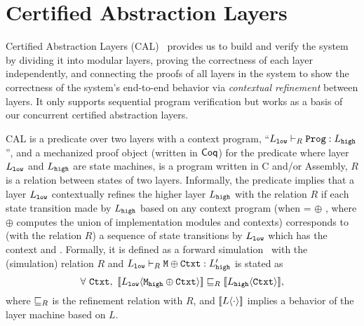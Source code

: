 \section{Certified Abstraction Layers}
\label{chapter:ccal:sec:cal}

Certified Abstraction Layers (CAL)~\cite{deepspec} provides us to build and verify the system by dividing it into modular layers, 
proving the correctness of each layer independently, and connecting the proofs of all layers in the system to show the correctness of the system's end-to-end behavior via \textit{contextual refinement} between layers. 
It only supports sequential program verification but works as a basis of our concurrent certified abstraction layers.

CAL is a predicate over two layers with a context program, 
``$L_{{\mathrm{\texttt{low}}}} \vdash_{R} {\mathrm{\texttt{Prog}}} : L_{{\mathrm{\texttt{high}}}}$'', 
and a mechanized proof object (written in $\mathsf{Coq}$) for the predicate where layer $L_{{\mathrm{\texttt{low}}}}$ and $L_{{\mathrm{\texttt{high}}}}$ are state machines,  is a program written in C and/or Assembly, $R$ is a relation between states of two layers.
Informally, the predicate implies that 
a layer $L_{{\mathrm{\texttt{low}}}}$ contextually refines the higher layer $L_{{\mathrm{\texttt{high}}}}$ with the relation $R$
 if each state transition made by $L_{{\mathrm{\texttt{high}}}}$ based on any context program  (when  =  $\oplus$ , where $\oplus$ computes the union of implementation modules and contexts) corresponds to (with the relation $R$)  a sequence of 
 state transitions by $L_{{\mathrm{\texttt{low}}}}$ which has the context  and  .
 Formally, it is defined as a forward simulation~\cite{Lynch95,leroy09,Milner71,Park81} with the (simulation) relation $R$
 and  $L_{{\mathrm{\texttt{low}}}} \vdash_{R} {\mathrm{\texttt{M}}} \oplus {\mathrm{\texttt{Ctxt}}} : L_{{\mathrm{\texttt{high}}}}'$ is stated as
$$\forall\ \codeinmath{Ctxt},\ \sem{L_{\codeinmath{low}}}{\codeinmath{M}_{\codeinmath{high}} \oplus \codeinmath{Ctxt}} \refines_{R} \sem{L_{\codeinmath{high}}}{\codeinmath{Ctxt}},$$
where $\sqsubseteq_{R}$ is the refinement relation with $R$, and $[\![{L} \langle {\cdot} \rangle]\!]$ implies  a  behavior of the layer machine based on $L$.


